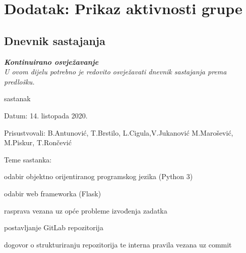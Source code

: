 \chapter*{Dodatak: Prikaz aktivnosti grupe}
		
		\section*{Dnevnik sastajanja}
		
		\textbf{\textit{Kontinuirano osvježavanje}}\\
		
		 \textit{U ovom dijelu potrebno je redovito osvježavati dnevnik sastajanja prema predlošku.}
		
		\begin{packed_enum}
			\item  sastanak
			
			\item[] \begin{packed_item}
				\item Datum: 14. listopada 2020.
				\item Prisustvovali: B.Antunović, T.Brstilo, L.Cigula,V.Jukanović M.Marošević, M.Piskur, T.Rončević
				\item Teme sastanka:
				\begin{packed_item}
					\item  odabir objektno orijentiranog programskog jezika (Python 3)
					\item  odabir web frameworka (Flask)
					\item  rasprava vezana uz opće probleme izvođenja zadatka
					\item  postavljanje GitLab repozitorija
					\item  dogovor o strukturiranju repozitorija te interna pravila vezana uz commit
				\end{packed_item}
			\end{packed_item}
			

\end{packed_enum}
